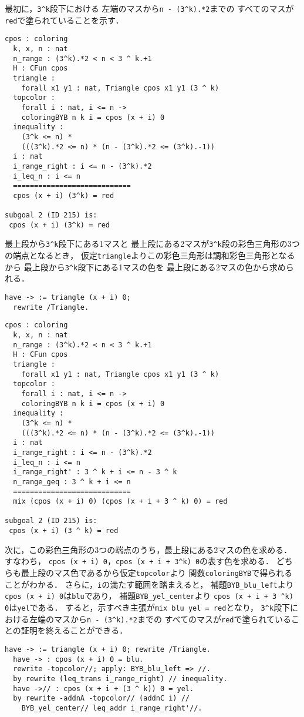 最初に，{\tt{3\verb|^|k}}段下における
左端のマスから{\tt{n - (3\verb|^|k).*2}}までの
すべてのマスが{\tt{red}}で塗られていることを示す．
\begin{lstlisting}[language=Coq]
  cpos : coloring
  k, x, n : nat
  n_range : (3^k).*2 < n < 3 ^ k.+1
  H : CFun cpos
  triangle :
    forall x1 y1 : nat, Triangle cpos x1 y1 (3 ^ k)
  topcolor :
    forall i : nat, i <= n ->
    coloringBYB n k i = cpos (x + i) 0
  inequality :
    (3^k <= n) *
    (((3^k).*2 <= n) * (n - (3^k).*2 <= (3^k).-1))
  i : nat
  i_range_right : i <= n - (3^k).*2
  i_leq_n : i <= n
  ============================
  cpos (x + i) (3^k) = red

subgoal 2 (ID 215) is:
 cpos (x + i) (3^k) = red
\end{lstlisting}
最上段から{\tt{3\verb|^|k}}段下にある1マスと
最上段にある2マスが{\tt{3\verb|^|k}}段の彩色三角形の3つの端点となるとき，
仮定{\tt{triangle}}よりこの彩色三角形は調和彩色三角形となるから
最上段から{\tt{3\verb|^|k}}段下にある1マスの色を
最上段にある2マスの色から求められる．
\begin{lstlisting}[language=Coq]
  have -> := triangle (x + i) 0;
  rewrite /Triangle.
\end{lstlisting}
\begin{lstlisting}[language=Coq]
  cpos : coloring
  k, x, n : nat
  n_range : (3^k).*2 < n < 3 ^ k.+1
  H : CFun cpos
  triangle :
    forall x1 y1 : nat, Triangle cpos x1 y1 (3 ^ k)
  topcolor :
    forall i : nat, i <= n ->
    coloringBYB n k i = cpos (x + i) 0
  inequality :
    (3^k <= n) *
    (((3^k).*2 <= n) * (n - (3^k).*2 <= (3^k).-1))
  i : nat
  i_range_right : i <= n - (3^k).*2
  i_leq_n : i <= n
  i_range_right' : 3 ^ k + i <= n - 3 ^ k
  n_range_geq : 3 ^ k + i <= n
  ============================
  mix (cpos (x + i) 0) (cpos (x + i + 3 ^ k) 0) = red

subgoal 2 (ID 215) is:
 cpos (x + i) (3 ^ k) = red
\end{lstlisting}
次に，この彩色三角形の3つの端点のうち，最上段にある2マスの色を求める．
すなわち，
{\tt{cpos (x + i) 0}}，{\tt{cpos (x + i + 3\verb|^|k) 0}}の表す色を求める．
どちらも最上段のマス色であるから仮定{\tt{topcolor}}より
関数{\tt{coloringBYB}}で得られることがわかる．
さらに，{\tt{i}}の満たす範囲を踏まえると，
補題{\tt{BYB\_blu\_left}}より
{\tt{cpos (x + i) 0}}は{\tt{blu}}であり，
補題{\tt{BYB\_yel\_center}}より
{\tt{cpos (x + i + 3 \verb|^|k) 0}}は{\tt{yel}}である．
すると，示すべき主張が{\tt{mix blu yel = red}}となり，
{\tt{3\verb|^|k}}段下における左端のマスから{\tt{n - (3\verb|^|k).*2}}までの
すべてのマスが{\tt{red}}で塗られていることの証明を終えることができる．
\begin{lstlisting}[language=Coq]
  have -> := triangle (x + i) 0; rewrite /Triangle.
  have -> : cpos (x + i) 0 = blu.
  rewrite -topcolor//; apply: BYB_blu_left => //.
  by rewrite (leq_trans i_range_right) // inequality.
  have ->// : cpos (x + i + (3 ^ k)) 0 = yel.
  by rewrite -addnA -topcolor// (addnC i) //
    BYB_yel_center// leq_addr i_range_right'//.
\end{lstlisting}

